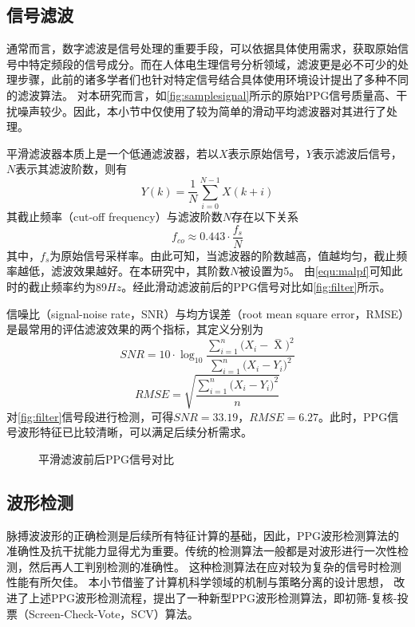 \subsection{信号滤波}
通常而言，数字滤波是信号处理的重要手段，可以依据具体使用需求，获取原始信号中特定频段的信号成分。而在人体电生理信号分析领域，滤波更是必不可少的处理步骤，此前的诸多学者们也针对特定信号结合具体使用环境设计提出了多种不同的滤波算法。
对本研究而言，如\autoref{fig:samplesignal}所示的原始PPG信号质量高、干扰噪声较少。因此，本小节中仅使用了较为简单的滑动平均滤波器对其进行了处理。

平滑滤波器本质上是一个低通滤波器，若以$X$表示原始信号，$Y$表示滤波后信号，$N$表示其滤波阶数，则有
\begin{equation}
    \label{equ:filter}
    Y(k)=\frac{1}{N}\sum_{i=0}^{N-1}X(k+i)
\end{equation}
其截止频率（cut-off frequency）与滤波阶数$N$存在以下关系\cite{malp2011,malp2022}
\begin{equation}
    \label{equ:malpf}
    f_{co} \approx 0.443 \cdot \frac{f_s}{N}    
\end{equation}
其中，$f_s$为原始信号采样率。由此可知，当滤波器的阶数越高，值越均匀，截止频率越低，滤波效果越好。在本研究中，其阶数$N$被设置为5。
由\autoref{equ:malpf}可知此时的截止频率约为89$Hz$。经此滑动滤波前后的PPG信号对比如\autoref{fig:filter}所示。

信噪比（signal-noise rate，SNR）与均方误差（root mean square error，RMSE）是最常用的评估滤波效果的两个指标，其定义分别为
\begin{equation}
    \label{equ:snr}
    SNR=10 \cdot \log_{10}\frac{\sum_{i=1}^{n}{(X_i-\mathop{X} \limits^-})^2}{\sum_{i=1}^{n}{(X_i-Y_i})^2}
\end{equation}
\begin{equation}
    \label{equ:rmse}
    RMSE=\sqrt{\frac{\sum_{i=1}^{n}{(X_i-Y_i})^2}{n}}
\end{equation}
对\autoref{fig:filter}信号段进行检测，可得$SNR=33.19$，$RMSE=6.27$。此时，PPG信号波形特征已比较清晰，可以满足后续分析需求。
\begin{figure}[htbp]
    \centering
    \quad
    \caption{\label{fig:filter}平滑滤波前后PPG信号对比}
\end{figure}

\subsection{波形检测}
脉搏波波形的正确检测是后续所有特征计算的基础，因此，PPG波形检测算法的准确性及抗干扰能力显得尤为重要。传统的检测算法一般都是对波形进行一次性检测，然后再人工判别检测的准确性。
这种检测算法在应对较为复杂的信号时检测性能有所欠佳。
本小节借鉴了计算机科学领域的机制与策略分离的设计思想，
改进了上述PPG波形检测流程，提出了一种新型PPG波形检测算法，即初筛-复核-投票（Screen-Check-Vote，SCV）算法。

